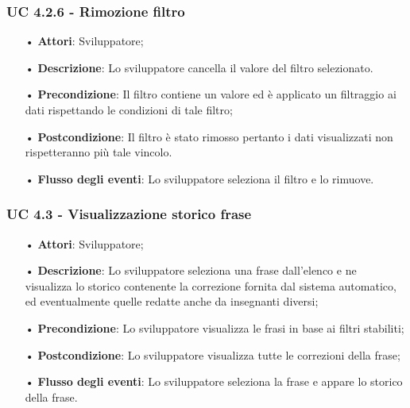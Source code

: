 \subsubsection{UC 4.2.6 - Rimozione filtro}
\begin{itemize}
\item[•]\textbf{Attori}: Sviluppatore;
\item[•]\textbf{Descrizione}: Lo sviluppatore cancella il valore del filtro selezionato.
\item[•]\textbf{Precondizione}: Il filtro contiene un valore ed è applicato un filtraggio ai dati rispettando le condizioni di tale filtro;
\item[•]\textbf{Postcondizione}: Il filtro è stato rimosso pertanto i dati visualizzati non rispetteranno più tale vincolo.
\item[•]\textbf{Flusso degli eventi}: Lo sviluppatore seleziona il filtro e lo rimuove.
 \end{itemize}
  
\subsubsection{UC 4.3 - Visualizzazione storico frase}
\begin{itemize}
\item[•]\textbf{Attori}: Sviluppatore;
\item[•]\textbf{Descrizione}: Lo sviluppatore seleziona una frase dall'elenco e ne visualizza lo storico contenente la correzione fornita dal sistema automatico, ed eventualmente quelle redatte anche da insegnanti diversi;
\item[•]\textbf{Precondizione}:  Lo sviluppatore visualizza le frasi in base ai filtri stabiliti;
\item[•]\textbf{Postcondizione}: Lo sviluppatore visualizza tutte le correzioni della frase;
\item[•]\textbf{Flusso degli eventi}: Lo sviluppatore seleziona la frase e appare lo storico della frase.
\end{itemize}

